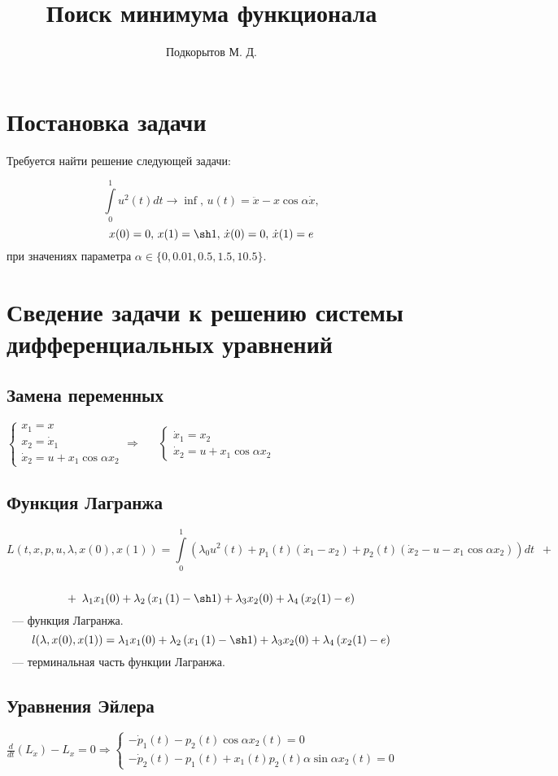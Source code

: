 \documentclass[24pt]{article}
\title{Поиск минимума функционала}
\author{Подкорытов М. Д.}
\begin{document}
\maketitle

\section{Постановка задачи}
Требуется найти решение следующей задачи:

\[
\int\limits_0^1u^2(t)dt \rightarrow \inf, \, u(t) = \ddot x - x\cos \alpha \dot x,
\]
\[
x(0) = 0, \, x(1) = \sh 1,\, \dot x(0) = 0,\, \dot x(1) = e 
\]
при значениях параметра $\alpha \in \{0, 0.01, 0.5, 1.5, 10.5\}$.

\section{Сведение задачи к решению системы дифференциальных уравнений}
\subsection{Замена переменных}
$
\begin{cases}
x_1 = x\\
x_2 = \dot x_1 \\
\dot x_2 = u + x_1 \cos \alpha x_2
\end{cases}
\Rightarrow\,\,\,\,\,\,\,\,\,
\begin{cases}
\dot x_1  = x_2\\
\dot x_2 = u + x_1 \cos \alpha x_2
\end{cases}
$
\subsection{Функция Лагранжа}
$$
L(t, x, p, u, \lambda, x(0), x(1)) = \int\limits_0^1\left(\lambda_0u^2\left(t\right)+p_1\left(t\right)\left(\dot x_1 - x_2\right) + p_2\left(t\right)\left(\dot x_2 - u - x_1\cos\alpha x_2\right)\right)dt \,\,\, + 
$$
\\
$$
+ \,\,\, \lambda_1x_1(0) + \lambda_2 \left(x_1\left(1\right) - \sh 1\right) + \lambda_3 x_2(0) + \lambda_4 \left(x_2(1) - e\right)
$$~--- функция Лагранжа.
$$l(\lambda, x(0), x(1)) = \lambda_1x_1(0) + \lambda_2 \left(x_1\left(1\right) - \sh 1\right) + \lambda_3 x_2(0) + \lambda_4 \left(x_2(1) - e\right)$$~--- терминальная часть функции Лагранжа.
\subsection{Уравнения Эйлера}
$
\frac{d}{dt} (L_{\dot x}) - L_{x} = 0 \Rightarrow 
\begin{cases}
-\dot p_1\left(t\right) - p_2\left(t\right)\cos\alpha x_2\left(t\right) = 0\\
-\dot p_2\left(t\right) - p_1\left(t\right) + x_1\left(t\right)p_2\left(t\right)\alpha\sin\alpha x_2\left(t\right) = 0
\end{cases}
$
\end{document}
